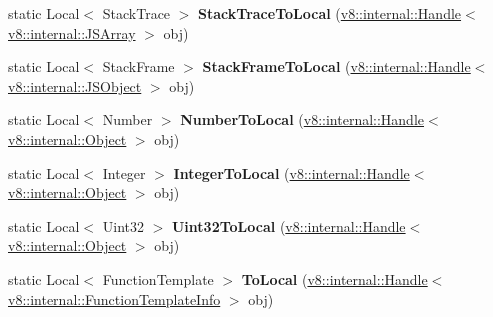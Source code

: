 \begin{DoxyCompactItemize}
\item 
\hypertarget{classv8_1_1_utils_abbe80959ee27b18d63b8b7e63a9cd851}{}static Local$<$ Stack\+Trace $>$ {\bfseries Stack\+Trace\+To\+Local} (\hyperlink{classv8_1_1internal_1_1_handle}{v8\+::internal\+::\+Handle}$<$ \hyperlink{classv8_1_1internal_1_1_j_s_array}{v8\+::internal\+::\+J\+S\+Array} $>$ obj)\label{classv8_1_1_utils_abbe80959ee27b18d63b8b7e63a9cd851}

\item 
\hypertarget{classv8_1_1_utils_adf9510d8c676ed3c2ab1fdac58de245e}{}static Local$<$ Stack\+Frame $>$ {\bfseries Stack\+Frame\+To\+Local} (\hyperlink{classv8_1_1internal_1_1_handle}{v8\+::internal\+::\+Handle}$<$ \hyperlink{classv8_1_1internal_1_1_j_s_object}{v8\+::internal\+::\+J\+S\+Object} $>$ obj)\label{classv8_1_1_utils_adf9510d8c676ed3c2ab1fdac58de245e}

\item 
\hypertarget{classv8_1_1_utils_af85cbf57e5ba5902a96abd044c2fc76e}{}static Local$<$ Number $>$ {\bfseries Number\+To\+Local} (\hyperlink{classv8_1_1internal_1_1_handle}{v8\+::internal\+::\+Handle}$<$ \hyperlink{classv8_1_1internal_1_1_object}{v8\+::internal\+::\+Object} $>$ obj)\label{classv8_1_1_utils_af85cbf57e5ba5902a96abd044c2fc76e}

\item 
\hypertarget{classv8_1_1_utils_aa6d14167b7e6d2d477a69e3507334c2a}{}static Local$<$ Integer $>$ {\bfseries Integer\+To\+Local} (\hyperlink{classv8_1_1internal_1_1_handle}{v8\+::internal\+::\+Handle}$<$ \hyperlink{classv8_1_1internal_1_1_object}{v8\+::internal\+::\+Object} $>$ obj)\label{classv8_1_1_utils_aa6d14167b7e6d2d477a69e3507334c2a}

\item 
\hypertarget{classv8_1_1_utils_a96bfef03b36b951d5ccdd1e7baa6bd68}{}static Local$<$ Uint32 $>$ {\bfseries Uint32\+To\+Local} (\hyperlink{classv8_1_1internal_1_1_handle}{v8\+::internal\+::\+Handle}$<$ \hyperlink{classv8_1_1internal_1_1_object}{v8\+::internal\+::\+Object} $>$ obj)\label{classv8_1_1_utils_a96bfef03b36b951d5ccdd1e7baa6bd68}

\item 
\hypertarget{classv8_1_1_utils_ac33191d795c39e9e142e1a5d8feb751d}{}static Local$<$ Function\+Template $>$ {\bfseries To\+Local} (\hyperlink{classv8_1_1internal_1_1_handle}{v8\+::internal\+::\+Handle}$<$ \hyperlink{classv8_1_1internal_1_1_function_template_info}{v8\+::internal\+::\+Function\+Template\+Info} $>$ obj)\label{classv8_1_1_utils_ac33191d795c39e9e142e1a5d8feb751d}


\end{DoxyCompactItemize}
